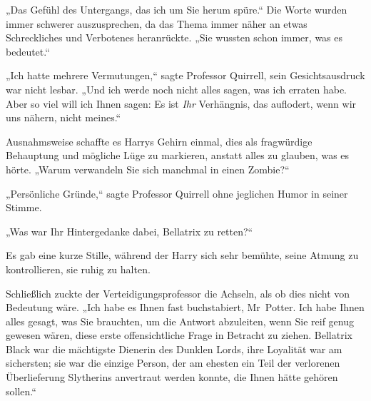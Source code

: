 „Das Gefühl des Untergangs, das ich um Sie herum spüre.“ Die Worte wurden immer schwerer auszusprechen, da das Thema immer näher an etwas Schreckliches und Verbotenes heranrückte. „Sie wussten schon immer, was es bedeutet.“

„Ich hatte mehrere Vermutungen,“ sagte Professor Quirrell, sein Gesichtsausdruck war nicht lesbar. „Und ich werde noch nicht alles sagen, was ich erraten habe. Aber so viel will ich Ihnen sagen: Es ist \emph{Ihr} Verhängnis, das auflodert, wenn wir uns nähern, nicht meines.“

Ausnahmsweise schaffte es Harrys Gehirn einmal, dies als fragwürdige Behauptung und mögliche Lüge zu markieren, anstatt alles zu glauben, was es hörte. „Warum verwandeln Sie sich manchmal in einen Zombie?“

„Persönliche Gründe,“ sagte Professor Quirrell ohne jeglichen Humor in seiner Stimme.

„Was war Ihr Hintergedanke dabei, Bellatrix zu retten?“

Es gab eine kurze Stille, während der Harry sich sehr bemühte, seine Atmung zu kontrollieren, sie ruhig zu halten.

Schließlich zuckte der Verteidigungsprofessor die Achseln, als ob dies nicht von Bedeutung wäre. „Ich habe es Ihnen fast buchstabiert, Mr~Potter. Ich habe Ihnen alles gesagt, was Sie brauchten, um die Antwort abzuleiten, wenn Sie reif genug gewesen wären, diese erste offensichtliche Frage in Betracht zu ziehen. Bellatrix Black war die mächtigste Dienerin des Dunklen Lords, ihre Loyalität war am sichersten; sie war die einzige Person, der am ehesten ein Teil der verlorenen Überlieferung Slytherins anvertraut werden konnte, die Ihnen hätte gehören sollen.“

